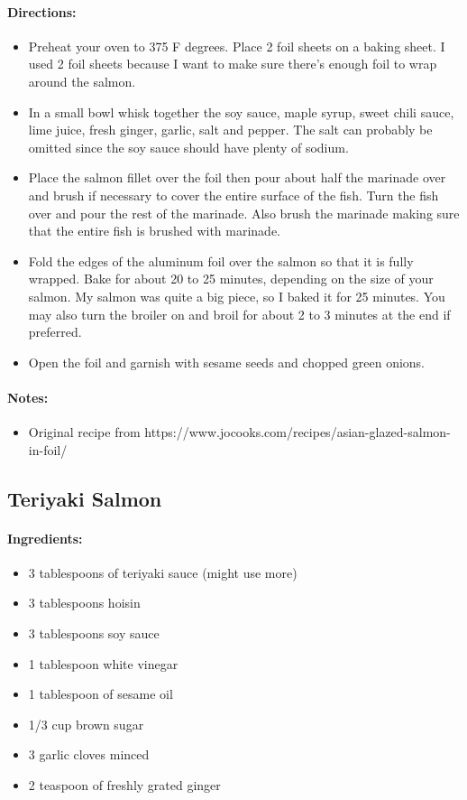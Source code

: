\documentclass{article}
\begin{document}
\paragraph{Directions:}
\begin{itemize}
    \item Preheat your oven to 375 F degrees. Place 2 foil sheets on a baking sheet. I used 2 foil sheets because I want to make sure there’s enough foil to wrap around the salmon.
    \item In a small bowl whisk together the soy sauce, maple syrup, sweet chili sauce, lime juice, fresh ginger, garlic, salt and pepper. The salt can probably be omitted since the soy sauce should have plenty of sodium.
    \item Place the salmon fillet over the foil then pour about half the marinade over and brush if necessary to cover the entire surface of the fish. Turn the fish over and pour the rest of the marinade. Also brush the marinade making sure that the entire fish is brushed with marinade.
    \item Fold the edges of the aluminum foil over the salmon so that it is fully wrapped. Bake for about 20 to 25 minutes, depending on the size of your salmon. My salmon was quite a big piece, so I baked it for 25 minutes. You may also turn the broiler on and broil for about 2 to 3 minutes at the end if preferred.
    \item Open the foil and garnish with sesame seeds and chopped green onions.
\end{itemize}

\paragraph{Notes:}
\begin{itemize}
    \item Original recipe from https://www.jocooks.com/recipes/asian-glazed-salmon-in-foil/
\end{itemize}

\subsection{Teriyaki Salmon}

\paragraph{Ingredients:}
\begin{itemize}
    \item 3 tablespoons of teriyaki sauce (might use more)
    \item 3 tablespoons hoisin
    \item 3 tablespoons soy sauce
    \item 1 tablespoon white vinegar
    \item 1 tablespoon of sesame oil
    \item 1/3 cup brown sugar
    \item 3 garlic cloves minced
    \item 2 teaspoon of freshly grated ginger
\end{itemize}
\end{document}
